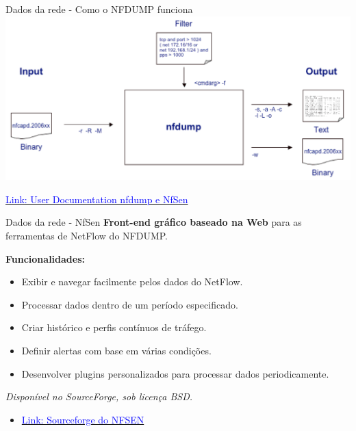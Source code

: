 \begin{frame}{Dados da rede - Como o NFDUMP funciona}
    \centering
    \includegraphics[width=0.85\linewidth]{Figuras/nfdump-filtros-processando.png}
    \vspace{0.3cm}


    \href{https://www.first.org/resources/papers/conference2006/haag-peter-papers.pdf}{\textcolor{blue}{Link: User Documentation nfdump e NfSen}}

\end{frame}

\begin{frame}{Dados da rede - NfSen}
    \textbf{Front-end gráfico baseado na Web} para as ferramentas de NetFlow do NFDUMP.

    \vspace{0.5cm}
    \textbf{Funcionalidades:}
    \begin{itemize}
        \item Exibir e navegar facilmente pelos dados do NetFlow.
        \item Processar dados dentro de um período especificado.
        \item Criar histórico e perfis contínuos de tráfego.
        \item Definir alertas com base em várias condições.
        \item Desenvolver plugins personalizados para processar dados periodicamente.
    \end{itemize}

    \vspace{0.5cm}
    \textit{Disponível no SourceForge, sob licença BSD.}

    \begin{itemize}
        \item \href{https://sourceforge.net/projects/nfsen/}{\textcolor{blue}{Link: Sourceforge do NFSEN}}
    \end{itemize}

\end{frame}

